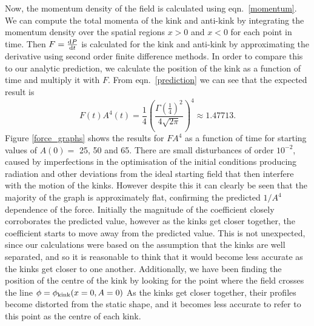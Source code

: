 \documentclass[11pt, oneside]{article}  	%
\numberwithin{equation}{section}
\newcommand{\drv}{\ensuremath{\textup{d}}}
\begin{document}
Now, the momentum density of the field is calculated using eqn.~\ref{momentum}. We can compute the total momenta of the kink and anti-kink by integrating the momentum density over the spatial regions $x>0$ and $x<0$ for each point in time. Then $F = \frac{\drv P}{\drv t}$ is calculated for the kink and anti-kink by approximating the derivative using second order finite difference methods. In order to compare this to our analytic prediction, we calculate the position of the kink as a function of time and multiply it with $F$. From eqn.~\ref{prediction} we can see that the expected result is
\begin{equation}
F(t) A^4(t) =\frac{1}{4} \left (\frac{ \Gamma\left(\frac{1}{4}\right)^2}{4\sqrt{2\pi} }\right )^4 \approx 1.47713.
\end{equation}
Figure \ref{force_graphs} shows the results for $FA^4$ as a function of time for starting values of $A(0) = $ 25, 50 and 65. There are small disturbances of order $10^{-2}$, caused by imperfections in the optimisation of the initial conditions producing radiation and other deviations from the ideal starting field that then interfere with the motion of the kinks. However despite this it can clearly be seen that the majority of the graph is approximately flat, confirming the predicted $1/A^4$ dependence of the force. Initially the magnitude of the coefficient closely corroborates the predicted value, however as the kinks get closer together, the coefficient starts to move away from the predicted value. This is not unexpected, since our calculations were based on the assumption that the kinks are well separated, and so it is reasonable to think that it would become less accurate as the kinks get closer to one another. Additionally, we have been finding the position of the centre of the kink by looking for the point where the field crosses the line $\phi = \phi_{\textup{kink}}(x=0,A=0)$ As the kinks get closer together, their profiles become distorted from the static shape, and it becomes less accurate to refer to this point as the centre of each kink.
\end{document}
